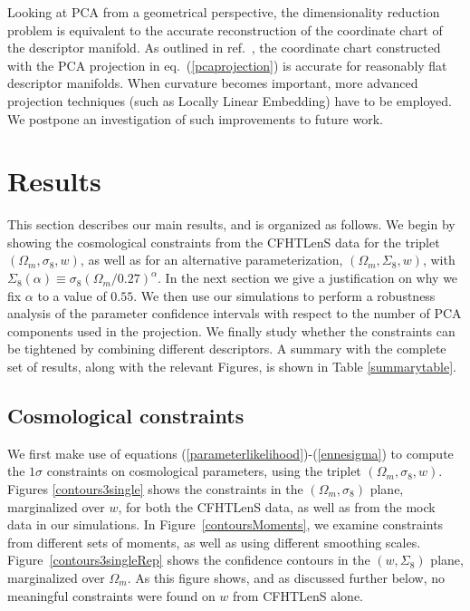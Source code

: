 \documentclass[reprint,aps,prd,superscriptaddress,showkeys,showpacs]{revtex4-1}
\begin{document}
Looking at PCA from a geometrical perspective, the dimensionality
reduction problem is equivalent to the accurate reconstruction of the
coordinate chart of the descriptor manifold. As outlined in
ref.~\citep{astroMLText}, the coordinate chart constructed with the
PCA projection in eq.~(\ref{pcaprojection}) is accurate for reasonably
flat descriptor manifolds. When curvature becomes important, more
advanced projection techniques (such as Locally Linear Embedding) have
to be employed.  We postpone an investigation of such improvements to
future work.




\section{Results}
\label{results}

This section describes our main results, and is organized as follows.
We begin by showing the cosmological constraints from the CFHTLenS
data for the triplet $(\Omega_m,\sigma_8,w)$, as well as for an
alternative parameterization, $(\Omega_m,\Sigma_8,w)$, with
$\Sigma_8(\alpha)\equiv \sigma_8(\Omega_m/0.27)^\alpha$. In the next section we give a justification on why we fix $\alpha$ to a value of $0.55$. 
We then use our simulations to perform a robustness analysis of the parameter
confidence intervals with respect to the number of PCA components used
in the projection.
We finally study whether the constraints can be tightened by combining
different descriptors. A summary with the complete set of results,
along with the relevant Figures, is shown in Table \ref{summarytable}.



\subsection{Cosmological constraints}
We first make use of equations
(\ref{parameterlikelihood})-(\ref{ennesigma}) to compute the $1\sigma$
constraints on cosmological parameters, using the triplet
$(\Omega_m,\sigma_8,w)$.  Figures \ref{contours3single} shows the
constraints in the $(\Omega_m,\sigma_8)$ plane, marginalized over $w$,
for both the CFHTLenS data, as well as from the mock data in our
simulations.  In Figure~\ref{contoursMoments}, we examine constraints
from different sets of moments, as well as using different smoothing
scales.  Figure~\ref{contours3singleRep} shows the confidence contours
in the $(w,\Sigma_8)$ plane, marginalized over $\Omega_m$. As this
figure shows, and as discussed further below, no meaningful
constraints were found on $w$ from CFHTLenS alone.
\end{document}
